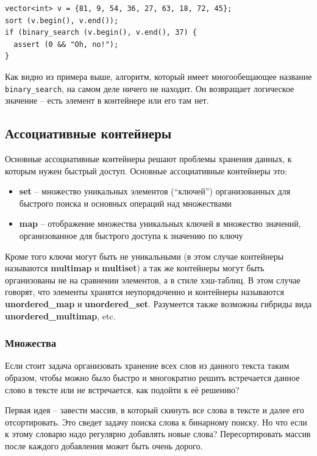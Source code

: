 \documentclass[a4paper,12pt,oneside]{article}
\begin{document}
\begin{lstlisting}
vector<int> v = {81, 9, 54, 36, 27, 63, 18, 72, 45};
sort (v.begin(), v.end());
if (binary_search (v.begin(), v.end(), 37) {
  assert (0 && "Oh, no!");
}
\end{lstlisting}

Как видно из примера выше, алгоритм, который имеет многообещающее название \lstinline!binary_search!, на самом деле ничего не находит. Он возвращает логическое значение -- есть элемент в контейнере или его там нет.

\pagebreak
\subsection{Ассоциативные контейнеры}\label{AssociativeContainers}

Основные ассоциативные контейнеры решают проблемы хранения данных, к которым нужен быстрый доступ. Основные ассоциативные контейнеры это:

\begin{itemize}
\item \textbf{set} -- множество уникальных элементов (``ключей'') организованных для быстрого поиска и основных операций над множествами
\item \textbf{map} -- отображение множества уникальных ключей в множество значений, организованное для быстрого доступа к значению по ключу
\end{itemize}

Кроме того ключи могут быть не уникальными (в этом случае контейнеры называются \textbf{multimap} и \textbf{multiset}) а так же контейнеры могут быть организованы не на сравнении элементов, а в стиле хэш-таблиц. В этом случае говорят, что элементы хранятся неупорядоченно и контейнеры называются \textbf{unordered\_map} и \textbf{unordered\_set}. Разумеется также возможны гибриды вида \textbf{unordered\_multimap}, etc.

\subsubsection{Множества}

Если стоит задача организовать хранение всех слов из данного текста таким образом, чтобы можно было быстро и многократно решить встречается данное слово в тексте или не встречается, как подойти к её решению?

Первая идея -- завести массив, в который скинуть все слова в тексте и далее его отсортировать. Это сведет задачу поиска слова к бинарному поиску. Но что если к этому словарю надо регулярно добавлять новые слова? Пересортировать массив после каждого добавления может быть очень дорого.
\end{document}

